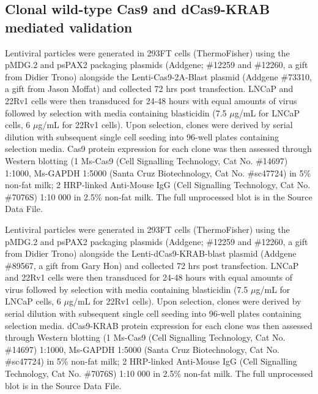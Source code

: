 \subsection{Clonal wild-type Cas9 and dCas9-KRAB mediated validation}

Lentiviral particles were generated in 293FT cells (ThermoFisher) using the pMDG.2 and psPAX2 packaging plasmids (Addgene; \#12259 and \#12260, a gift from Didier Trono) alongside the Lenti-Cas9-2A-Blast plasmid (Addgene \#73310, a gift from Jason Moffat) and collected 72 hrs post transfection.
LNCaP and 22Rv1 cells were then transduced for 24-48 hours with equal amounts of virus followed by selection with media containing blasticidin (7.5 $\mu$g/mL for LNCaP cells, 6 $\mu$g/mL for 22Rv1 cells).
Upon selection, clones were derived by serial dilution with subsequent single cell seeding into 96-well plates containing selection media.
Cas9 protein expression for each clone was then assessed through Western blotting (1 \textdegree Ms-Cas9 (Cell Signalling Technology, Cat No. \#14697) 1:1000, Ms-GAPDH 1:5000 (Santa Cruz Biotechnology, Cat No. \#sc47724) in 5\% non-fat milk; 2 \textdegree HRP-linked Anti-Mouse IgG (Cell Signalling Technology, Cat No. \#7076S) 1:10 000 in 2.5\% non-fat milk.
The full unprocessed blot is in the Source Data File.

Lentiviral particles were generated in 293FT cells (ThermoFisher) using the pMDG.2 and psPAX2 packaging plasmids (Addgene; \#12259 and \#12260, a gift from Didier Trono) alongside the Lenti-dCas9-KRAB-blast plasmid (Addgene \#89567, a gift from Gary Hon) and collected 72 hrs post transfection.
LNCaP and 22Rv1 cells were then transduced for 24-48 hours with equal amounts of virus followed by selection with media containing blasticidin (7.5 $\mu$g/mL for LNCaP cells, 6 $\mu$g/mL for 22Rv1 cells).
Upon selection, clones were derived by serial dilution with subsequent single cell seeding into 96-well plates containing selection media.
dCas9-KRAB protein expression for each clone was then assessed through Western blotting (1 \textdegree Ms-Cas9 (Cell Signalling Technology, Cat No. \#14697) 1:1000, Ms-GAPDH 1:5000 (Santa Cruz Biotechnology, Cat No. \#sc47724) in 5\% non-fat milk; 2 \textdegree HRP-linked Anti-Mouse IgG (Cell Signalling Technology, Cat No. \#7076S) 1:10 000 in 2.5\% non-fat milk.
The full unprocessed blot is in the Source Data File.

